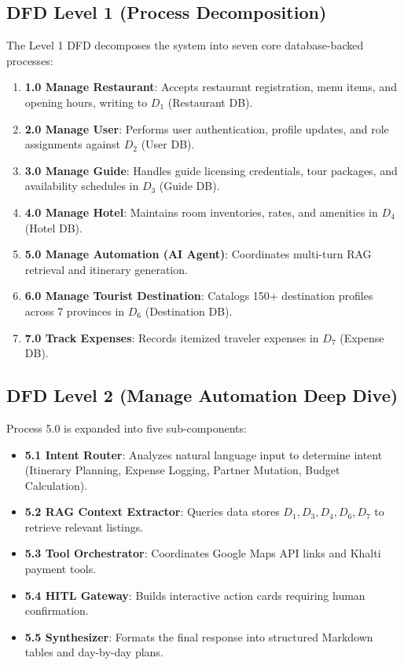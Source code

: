 \documentclass[12pt,a4paper]{report}
\begin{document}
\subsection{DFD Level 1 (Process Decomposition)}
The Level 1 DFD decomposes the system into seven core database-backed processes:
\begin{enumerate}
    \item \textbf{1.0 Manage Restaurant}: Accepts restaurant registration, menu items, and opening hours, writing to $D_1$ (Restaurant DB).
    \item \textbf{2.0 Manage User}: Performs user authentication, profile updates, and role assignments against $D_2$ (User DB).
    \item \textbf{3.0 Manage Guide}: Handles guide licensing credentials, tour packages, and availability schedules in $D_3$ (Guide DB).
    \item \textbf{4.0 Manage Hotel}: Maintains room inventories, rates, and amenities in $D_4$ (Hotel DB).
    \item \textbf{5.0 Manage Automation (AI Agent)}: Coordinates multi-turn RAG retrieval and itinerary generation.
    \item \textbf{6.0 Manage Tourist Destination}: Catalogs 150+ destination profiles across 7 provinces in $D_6$ (Destination DB).
    \item \textbf{7.0 Track Expenses}: Records itemized traveler expenses in $D_7$ (Expense DB).
\end{enumerate}

\subsection{DFD Level 2 (Manage Automation Deep Dive)}
Process 5.0 is expanded into five sub-components:
\begin{itemize}
    \item \textbf{5.1 Intent Router}: Analyzes natural language input to determine intent (Itinerary Planning, Expense Logging, Partner Mutation, Budget Calculation).
    \item \textbf{5.2 RAG Context Extractor}: Queries data stores $D_1, D_3, D_4, D_6, D_7$ to retrieve relevant listings.
    \item \textbf{5.3 Tool Orchestrator}: Coordinates Google Maps API links and Khalti payment tools.
    \item \textbf{5.4 HITL Gateway}: Builds interactive action cards requiring human confirmation.
    \item \textbf{5.5 Synthesizer}: Formats the final response into structured Markdown tables and day-by-day plans.
\end{itemize}
\end{document}

